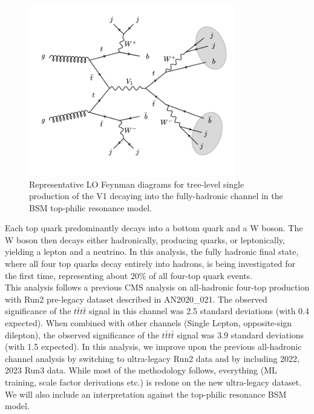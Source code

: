 \documentclass[twoside]{article}
\begin{document}
\begin{figure}[h!]
    \centering
    \includegraphics[width=0.8\textwidth]{plots/tp_feymann.png}
    \caption{Representative LO Feynman diagrams for tree-level single production of the V1 decaying into the fully-hadronic channel in the BSM top-philic resonance model.}
    \label{fig:tp_feymann}
\end{figure}

Each top quark predominantly decays into a bottom quark and a W boson. The W boson then decays either hadronically, producing quarks, or leptonically, yielding a lepton and a neutrino. In this analysis, the fully hadronic final state, where all four top quarks decay entirely into hadrons, is being investigated for the first time, representing about 20\% of all four-top quark events.\\

This analysis follows a previous CMS analysis \cite{prev_ftop_analysis} on all-hadronic four-top production with Run2 pre-legacy dataset described in AN2020\_021. The observed significance of the \(t\bar{t}t\bar{t}\) signal in this channel was 2.5 standard deviations (with 0.4 expected). When combined  with other channels (Single Lepton, opposite-sign dilepton), the observed significance of the \(t\bar{t}t\bar{t}\) signal was 3.9 standard deviations (with 1.5 expected). In this analysis, we improve upon the previous all-hadronic channel analysis by switching to ultra-legacy Run2 data and by including 2022, 2023 Run3 data. While most of the methodology follows, everything (ML training, scale factor derivations etc.) is redone on the new ultra-legacy dataset. We will also include an interpretation against the top-philic resonance BSM model\cite{topphilic}.\\
\end{document}
